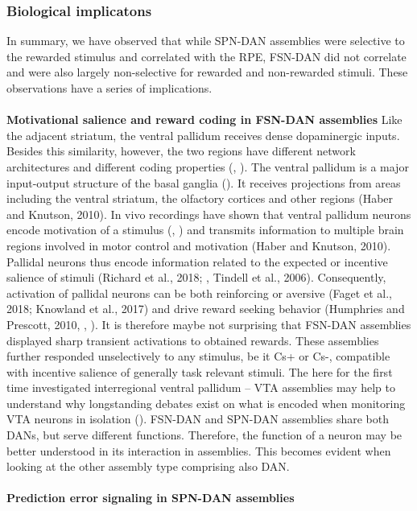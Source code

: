 \subsubsection{Biological implicatons}
In summary, we have observed that while SPN-DAN assemblies were selective to the rewarded stimulus and correlated with the RPE, FSN-DAN did not correlate and were also largely non-selective for rewarded and non-rewarded stimuli. These observations have a series of implications.\\\\
\textbf{Motivational salience and reward coding in FSN-DAN assemblies}
Like the adjacent striatum, the ventral pallidum receives dense dopaminergic inputs. Besides this similarity, however, the two regions have different network architectures and different coding properties (\cite{Heimer1997}, \cite{Tachibana2012}). The ventral pallidum is a major input-output structure of the basal ganglia (\cite{Heimer1997}). It receives projections from areas including the ventral striatum, the olfactory cortices and other regions (Haber and Knutson, 2010). In vivo recordings have shown that ventral pallidum neurons encode motivation of a stimulus (\cite{Tachibana2012}, \cite{TianHuang}) and transmits information to multiple brain regions involved in motor control and motivation (Haber and Knutson, 2010). Pallidal neurons thus encode information related to the expected or incentive salience of stimuli (Richard et al., 2018; \cite{TianHuang}, Tindell et al., 2006). Consequently, activation of pallidal neurons can be both reinforcing or aversive (Faget et al., 2018; Knowland et al., 2017) and drive reward seeking behavior (Humphries and Prescott, 2010, \cite{Root}, \cite{Berridge}). It is therefore maybe not surprising that FSN-DAN assemblies displayed sharp transient activations to obtained rewards. These assemblies further responded unselectively to any stimulus, be it Cs+ or Cs-, compatible with incentive salience of generally task relevant stimuli. The here for the first time investigated interregional ventral pallidum – VTA assemblies may help to understand why longstanding debates exist on what is encoded when monitoring VTA neurons in isolation (\cite{Redgrave}). FSN-DAN and SPN-DAN assemblies share both DANs, but serve different functions. Therefore, the function of a neuron may be better understood in its interaction in assemblies. This becomes evident when looking at the other assembly type comprising also DAN.\\\\
\textbf{Prediction error signaling in SPN-DAN assemblies}\\

